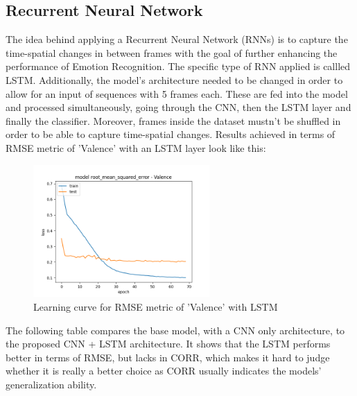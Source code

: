 \subsection{Recurrent Neural Network}

The idea behind applying a Recurrent Neural Network (RNNs) is to capture the time-spatial changes in between frames with the goal of further enhancing the performance of Emotion Recognition. The specific type of RNN applied is callled LSTM. Additionally, the model's architecture needed to be changed in order to allow for an input of sequences with 5 frames each. These are fed into the model and processed simultaneously, going through the CNN, then the LSTM layer and finally the classifier. Moreover, frames inside the dataset mustn't be shuffled in order to be able to capture time-spatial changes.
\newline\newline
Results achieved in terms of RMSE metric of 'Valence' with an LSTM layer look like this:

\begin{figure}[H]
  \begin{center}
  \includegraphics[angle=0, width=0.6\textwidth]{Figures/rmse_out_LSTM.png}
  \caption{Learning curve for RMSE metric of 'Valence' with LSTM}
  \label{fig:AblationLSTM}
  \end{center}
\end{figure}

The following table compares the base model, with a CNN only architecture, to the proposed CNN + LSTM architecture. It shows that the LSTM performs better in terms of RMSE, but lacks in CORR, which makes it hard to judge whether it is really a better choice as CORR usually indicates the models' generalization ability. 

